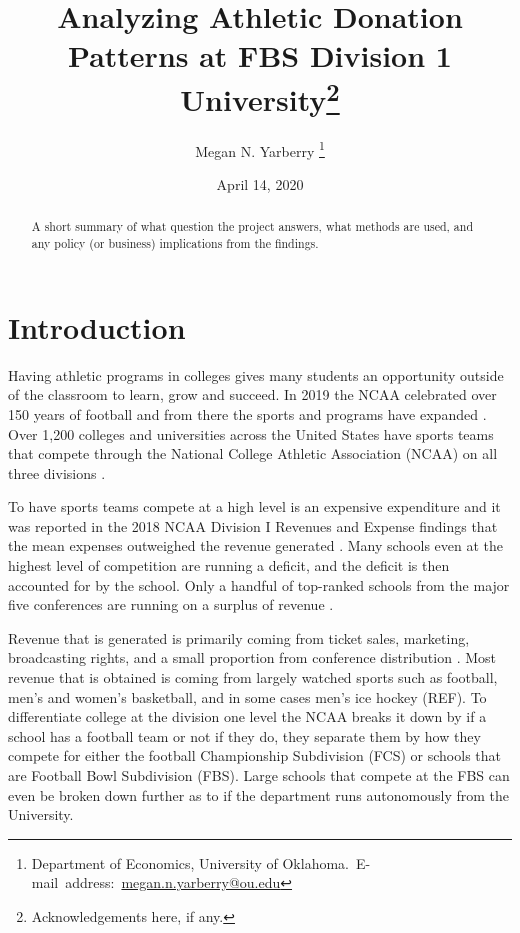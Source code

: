 \documentclass[12pt,english]{article}
\begin{document}
\begin{singlespace}
\title{Analyzing Athletic Donation Patterns at FBS Division 1 University\thanks{Acknowledgements here, if any.}}
\end{singlespace}

\author{Megan N. Yarberry \thanks{Department of Economics, University of Oklahoma.\
E-mail~address:~\href{mailto:megan.n.yarberry@ou.edu}{megan.n.yarberry@ou.edu}}}

\date{April 14, 2020}

\maketitle

\begin{abstract}
\begin{singlespace}
A short summary of what question the project answers, what methods are used, and any policy (or business) implications from the findings.
\end{singlespace}

\end{abstract}
\vfill{}


\pagebreak{}


\section{Introduction}\label{sec:intro}
Having athletic programs in colleges gives many students an opportunity outside of the classroom to learn, grow and succeed. In 2019 the NCAA celebrated over 150 years of football and from there the sports and programs have expanded \citet{parlier_2020}. Over 1,200 colleges and universities across the United States have sports teams that compete through the National College Athletic Association (NCAA) on all three divisions \citet{ncaa_2019}. 

To have sports teams compete at a high level is an expensive expenditure and it was reported in the 2018 NCAA Division I Revenues and Expense findings that the mean expenses outweighed the revenue generated \citet{parlier_2020}. Many schools even at the highest level of competition are running a deficit, and the deficit is then accounted for by the school. Only a handful of top-ranked schools from the major five conferences are running on a surplus of revenue \citet{thomas_2019}.

Revenue that is generated is primarily coming from ticket sales, marketing, broadcasting rights, and a small proportion from conference distribution \citet{thomas_2019}. Most revenue that is obtained is coming from largely watched sports such as football, men’s and women’s basketball, and in some cases men’s ice hockey (REF). To differentiate college at the division one level the NCAA breaks it down by if a school has a football team or not if they do, they separate them by how they compete for either the football Championship Subdivision (FCS) or schools that are Football Bowl Subdivision (FBS). Large schools that compete at the FBS can even be broken down further as to if the department runs autonomously from the University. 
\end{document}
